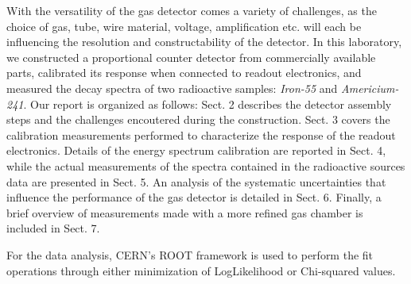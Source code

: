 With the versatility of the gas detector comes a variety of challenges, as the choice of gas, tube, wire material, voltage, amplification etc. will each be influencing the resolution and constructability of the detector. In this laboratory, we constructed a proportional counter detector from commercially available parts, calibrated its response when connected to readout electronics, and measured the decay spectra of two radioactive samples: \emph{Iron-55} and \emph{Americium-241}. Our report is organized as follows: Sect. 2 describes the detector assembly steps and the challenges encoutered during the construction. Sect. 3 covers the calibration measurements performed to characterize the response of the readout electronics. Details of the energy spectrum calibration are reported in Sect. 4, while the actual measurements of the spectra contained in the radioactive sources data are presented in Sect. 5. An analysis of the systematic uncertainties that influence the performance of the gas detector is detailed in Sect. 6. Finally, a brief overview of measurements made with a more refined gas chamber is included in Sect. 7.

For the data analysis, CERN's ROOT framework \cite{Brun:1997pa} is used to perform the fit operations through either minimization of LogLikelihood or Chi-squared values.
